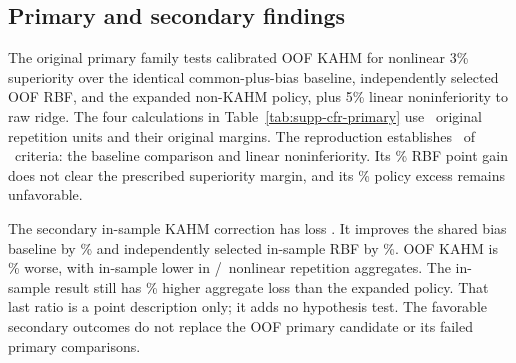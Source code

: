\subsection{Primary and secondary findings}

The original primary family tests calibrated OOF KAHM for nonlinear
3\% superiority over the identical common-plus-bias baseline,
independently selected OOF RBF, and the expanded non-KAHM policy, plus
5\% linear noninferiority to raw ridge. The four calculations in
Table~\ref{tab:supp-cfr-primary} use \CFRRepetitions\ original repetition
units and their original margins. The reproduction establishes
\CFRPrimaryEstablished\ of \CFRPrimaryCount\ criteria: the baseline
comparison and linear noninferiority. Its \CFRGainRBF\% RBF point gain
does not clear the prescribed superiority margin, and its
\CFRPolicyPenalty\% policy excess remains unfavorable.

\begin{table}[t]
\centering\small
\caption{Original four-claim residual-target family, recomputed on the
same prescribed simulation cohort. A positive simultaneous lower margin
gap establishes the stated claim. The reproduction contributes no
independent replication of these comparisons.}
\label{tab:supp-cfr-primary}

\end{table}

The secondary in-sample KAHM correction has loss \CFRISLoss. It improves
the shared bias baseline by \CFRISGainBias\% and independently selected
in-sample RBF by \CFRISGainRBF\%. OOF KAHM is
\CFROOFvsISPenalty\% worse, with in-sample lower in
\CFRISWinningRepetitions/\CFRRepetitions\ nonlinear repetition aggregates.
The in-sample result still has \CFRISPolicyPenalty\% higher aggregate
loss than the expanded policy. That last ratio is a point description
only; it adds no hypothesis test. The favorable secondary outcomes do
not replace the OOF primary candidate or its failed primary comparisons.

\begin{table}[t]
\centering\small
\caption{Prespecified residual-target, matched-bank, allocation, and
calibration diagnostics. Every interval is a descriptive unadjusted
two-sided 95\% paired-$t$ interval. ``Unit weight'' retains the calibrated
procedure's already selected settings; it does not retune on D.}
\label{tab:supp-cfr-secondary}

\end{table}


